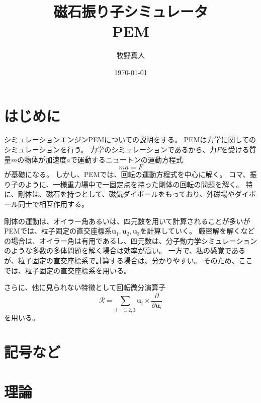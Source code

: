 \documentclass[a4paper,11pt]{jbook}
\title{磁石振り子シミュレータ\\PEM}
\author{牧野真人}
\date{\today}
\def\vecR {\bm {\mathcal {R} } }
\begin{document}
\maketitle
\tableofcontents 
\chapter{はじめに}
シミュレーションエンジンPEMについての説明をする。
PEMは力学に関してのシミュレーションを行う。
力学のシミュレーションであるから、力$F$を受ける質量$m$の物体が加速度$a$で運動するニュートンの運動方程式
\begin{equation}
ma=F
\end{equation}
が基礎になる。
しかし、PEMでは、回転の運動方程式を中心に解く。
コマ、振り子のように、一様重力場中で一固定点を持った剛体の回転の問題を解く。
特に、剛体は、磁石を持つとして、磁気ダイポールをもっており、外磁場やダイポール同士で相互作用する。

剛体の運動は、オイラー角あるいは、四元数を用いて計算されることが多いがPEMでは、粒子固定の直交座標系$\bm{u}_1,\bm{u}_2,\bm{u}_3$を計算していく。
厳密解を解くなどの場合は、オイラー角は有用であるし、四元数は、分子動力学シミュレーションのような多数の多体問題を解く場合は効率が高い。
一方で、私の感覚であるが、粒子固定の直交座標系で計算する場合は、分かりやすい。
そのため、ここでは、粒子固定の直交座標系を用いる。

さらに、他に見られない特徴として回転微分演算子
\begin{equation}
\vecR =\sum_{i=1,2,3}\bm{u}_i\times\frac{\partial}{\partial \bm{u}_i}
\end{equation}
を用いる。
\chapter{記号など}

\chapter{理論}
\end{document}
